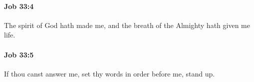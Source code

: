		\paragraph{Job 33:4} %
			\label{JOB-33-4}

			The spirit of God hath made me, and the breath of the Almighty hath given me life.


		\paragraph{Job 33:5} %
			\label{JOB-33-5}

			If thou canst answer me, set thy words in order before me, stand up.


